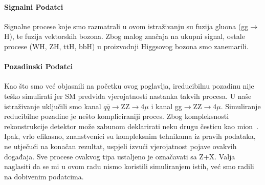 \documentclass[12pt,a4paper,oneside]{article}
\begin{document}
\begin{linenumbers}
		\paragraph{Signalni Podatci\newline}
		Signalne procese koje smo razmatrali u ovom istraživanju su fuzija gluona (gg$\rightarrow$H), te fuzija vektorskih bozona. Zbog malog značaja na ukupni signal, ostale procese (WH, ZH, ttH, bbH) u proizvodnji Higgsovog bozona smo zanemarili.
		
		\paragraph{Pozadinski Podatci\newline}
		Kao što smo već objasnili na početku ovog poglavlja, ireducibilnu pozadinu nije teško simulirati jer SM predviđa vjerojatnosti nastanka takvih procesa. U naše istraživanje uključili smo kanal $q\bar{q}$$\rightarrow$ZZ$\rightarrow$4$\mu$ i kanal  gg$\rightarrow$ZZ$\rightarrow$4$\mu$.
		Simuliranje reducibilne pozadine je nešto kompliciraniji proces. Zbog kompleksnosti rekonstrukcije detektor može zabunom deklarirati neku drugu česticu kao mion~\cite{doktorat}. Ipak, vrlo efikasno, znanstvenici su kompleksnim tehnikama iz pravih podataka, ne utječući na konačan rezultat, uspjeli izvući vjerojatnost pojave ovakvih događaja. Sve procese ovakvog tipa ustaljeno je označavati sa Z+X. Valja naglasiti da se mi u ovom radu nismo koristili simuliranjem istih, već smo radili na dobivenim podatcima.
	

\end{linenumbers}
\end{document}
